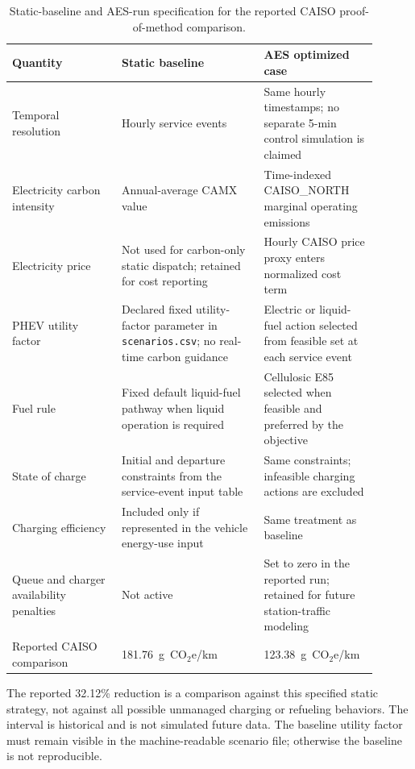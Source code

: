 \documentclass[cleantechnol,article,submit,pdftex,moreauthors]{Definitions/mdpi}
\newcommand{\gcoeqkm}{g~CO$_2$e/km}
\begin{document}
\begin{table}[htbp]
	\centering
	\begin{threeparttable}
		\caption{Static-baseline and AES-run specification for the reported CAISO proof-of-method comparison.}
		\label{tab:baseline_specification}
		\scriptsize
		\begin{tabular}{p{0.27\linewidth}p{0.35\linewidth}p{0.28\linewidth}}
			\toprule
			Quantity & Static baseline & AES optimized case \\
			\midrule
			Temporal resolution & Hourly service events & Same hourly timestamps; no separate 5-min control simulation is claimed \\
			Electricity carbon intensity & Annual-average CAMX value & Time-indexed CAISO\_NORTH marginal operating emissions \\
			Electricity price & Not used for carbon-only static dispatch; retained for cost reporting & Hourly CAISO price proxy enters normalized cost term \\
			PHEV utility factor & Declared fixed utility-factor parameter in \texttt{scenarios.csv}; no real-time carbon guidance & Electric or liquid-fuel action selected from feasible set at each service event \\
			Fuel rule & Fixed default liquid-fuel pathway when liquid operation is required & Cellulosic E85 selected when feasible and preferred by the objective \\
			State of charge & Initial and departure constraints from the service-event input table & Same constraints; infeasible charging actions are excluded \\
			Charging efficiency & Included only if represented in the vehicle energy-use input & Same treatment as baseline \\
			Queue and charger availability penalties & Not active & Set to zero in the reported run; retained for future station-traffic modeling \\
			Reported CAISO comparison & 181.76~\gcoeqkm{} & 123.38~\gcoeqkm{} \\
			\bottomrule
		\end{tabular}
		\begin{tablenotes}
			\footnotesize
			\item The reported 32.12\% reduction is a comparison against this specified static strategy, not against all possible unmanaged charging or refueling behaviors. The interval is historical and is not simulated future data. The baseline utility factor must remain visible in the machine-readable scenario file; otherwise the baseline is not reproducible.
		\end{tablenotes}
	\end{threeparttable}
\end{table}
\end{document}

